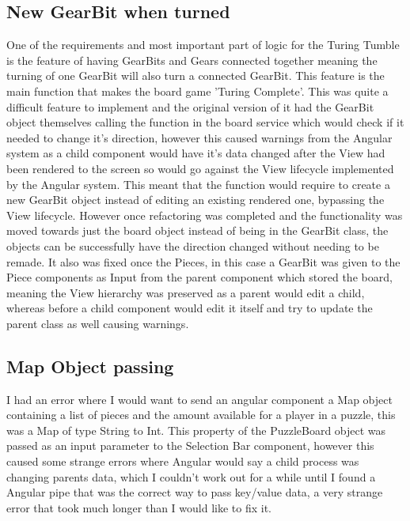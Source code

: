\documentclass{l4proj}
\begin{document}
\subsection{New GearBit when turned}
One of the requirements and most important part of logic for the Turing Tumble is the feature of having GearBits and Gears connected together meaning the turning of one GearBit will also turn a connected GearBit. This feature is the main function that makes the board game 'Turing Complete'. This was quite a difficult feature to implement and the original version of it had the GearBit object themselves calling the function in the board service which would check if it needed to change it's direction, however this caused warnings from the Angular system as a child component would have it's data changed after the View had been rendered to the screen so would go against the View lifecycle implemented by the Angular system. This meant that the function would require to create a new GearBit object instead of editing an existing rendered one, bypassing the View lifecycle. However once refactoring was completed and the functionality was moved towards just the board object instead of being in the GearBit class, the objects can be successfully have the direction changed without needing to be remade. It also was fixed once the Pieces, in this case a GearBit was given to the Piece components as Input from the parent component which stored the board, meaning the View hierarchy was preserved as a parent would edit a child, whereas before a child component would edit it itself and try to update the parent class as well causing warnings.

\subsection{Map Object passing}
I had an error where I would want to send an angular component a Map object containing a list of pieces and the amount available for a player in a puzzle, this was a Map of type String to Int. This property of the PuzzleBoard object was passed as an input parameter to the Selection Bar component, however this caused some strange errors where Angular would say a child process was changing parents data, which I couldn't work out for a while until I found a Angular pipe that was the correct way to pass key/value data, a very strange error that took much longer than I would like to fix it.
\end{document}
